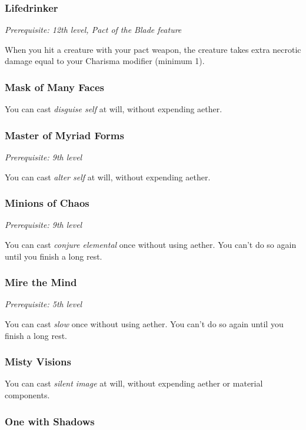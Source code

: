 \subsubsection{Lifedrinker}

\textit{Prerequisite: 12th level, Pact of the Blade feature}

When you hit a creature with your pact weapon, the creature takes extra necrotic damage equal to your Charisma modifier (minimum 1).

\subsubsection{Mask of Many Faces}

You can cast \textit{disguise self} at will, without expending aether.

\subsubsection{Master of Myriad Forms}

\textit{Prerequisite: 9th level}

You can cast \textit{alter self} at will, without expending aether.

\subsubsection{Minions of Chaos}

\textit{Prerequisite: 9th level}

You can cast \textit{conjure elemental} once without using aether. You can't do so again until you finish a long rest.

\subsubsection{Mire the Mind}

\textit{Prerequisite: 5th level}

You can cast \textit{slow} once without using aether. You can't do so again until you finish a long rest.

\subsubsection{Misty Visions}

You can cast \textit{silent image} at will, without expending aether or material components.

\subsubsection{One with Shadows}

